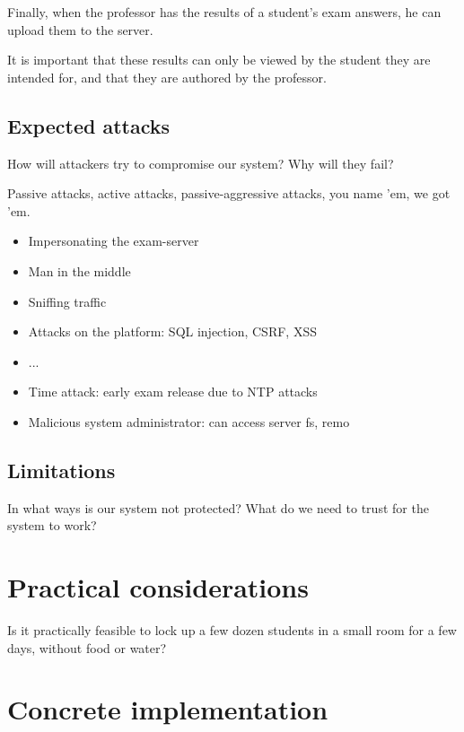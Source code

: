 \documentclass{article}
\begin{document}
Finally, when the professor has the results of a student's exam answers, he
can upload them to the server.

It is important that these results can only be viewed by the student 
they are intended for, and that they are authored by the professor.

\subsection{Expected attacks}
\label{subsec:req-attacks}

How will attackers try to compromise our system? Why will they fail?

Passive attacks, active attacks, passive-aggressive attacks, you name 'em, we
got 'em.

\begin{itemize}
\item Impersonating the exam-server
\item Man in the middle
\item Sniffing traffic
\item Attacks on the platform: SQL injection, CSRF, XSS
\item ...
\item Time attack: early exam release due to NTP attacks
\item Malicious system administrator: can access server fs, remo
\end{itemize}

\subsection{Limitations}
\label{subsec:req-limitations}

In what ways is our system not protected? What do we need to trust for the
system to work?

\section{Practical considerations}
\label{sec:practical}

Is it practically feasible to lock up a few dozen students in a small room for a
few days, without food or water?

\section{Concrete implementation}
\label{sec:implementation}
\end{document}
